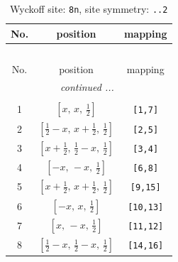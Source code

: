 \documentclass[fleqn,8pt]{jsarticle}
\begin{document}
\begin{longtable}{ccc}
\caption{Wyckoff site: {\tt 8n}, site symmetry: {\tt ..2}}
 \\
 \hline \hline
No. & position & mapping \\ \hline \endfirsthead

\multicolumn{2}{l}{\tablename\ \thetable{}} \\
 \hline \hline
No. & position & mapping \\ \hline \endhead

 \hline \hline
\multicolumn{2}{r}{\footnotesize\it continued ...} \\ \endfoot

 \hline \hline
\multicolumn{2}{r}{} \\ \endlastfoot

1 & $\left[ x,\, x,\, \frac{1}{2} \right]$ & {\tt [1,7]} \\ \hline
2 & $\left[ \frac{1}{2} - x,\, x + \frac{1}{2},\, \frac{1}{2} \right]$ & {\tt [2,5]} \\ \hline
3 & $\left[ x + \frac{1}{2},\, \frac{1}{2} - x,\, \frac{1}{2} \right]$ & {\tt [3,4]} \\ \hline
4 & $\left[ - x,\, - x,\, \frac{1}{2} \right]$ & {\tt [6,8]} \\ \hline
5 & $\left[ x + \frac{1}{2},\, x + \frac{1}{2},\, \frac{1}{2} \right]$ & {\tt [9,15]} \\ \hline
6 & $\left[ - x,\, x,\, \frac{1}{2} \right]$ & {\tt [10,13]} \\ \hline
7 & $\left[ x,\, - x,\, \frac{1}{2} \right]$ & {\tt [11,12]} \\ \hline
8 & $\left[ \frac{1}{2} - x,\, \frac{1}{2} - x,\, \frac{1}{2} \right]$ & {\tt [14,16]} \\
\end{longtable}
\renewcommand{\arraystretch}{1.2}
\end{document}
